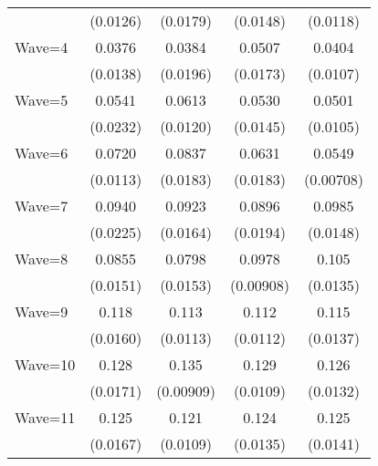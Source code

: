 {\begin{tabular}{l*{4}{c}}
                    &    (0.0126)         &    (0.0179)         &    (0.0148)         &    (0.0118)         \\
[1em]
Wave=4              &      0.0376\sym{**} &      0.0384         &      0.0507\sym{**} &      0.0404\sym{***}\\
                    &    (0.0138)         &    (0.0196)         &    (0.0173)         &    (0.0107)         \\
[1em]
Wave=5              &      0.0541\sym{*}  &      0.0613\sym{***}&      0.0530\sym{***}&      0.0501\sym{***}\\
                    &    (0.0232)         &    (0.0120)         &    (0.0145)         &    (0.0105)         \\
[1em]
Wave=6              &      0.0720\sym{***}&      0.0837\sym{***}&      0.0631\sym{***}&      0.0549\sym{***}\\
                    &    (0.0113)         &    (0.0183)         &    (0.0183)         &   (0.00708)         \\
[1em]
Wave=7              &      0.0940\sym{***}&      0.0923\sym{***}&      0.0896\sym{***}&      0.0985\sym{***}\\
                    &    (0.0225)         &    (0.0164)         &    (0.0194)         &    (0.0148)         \\
[1em]
Wave=8              &      0.0855\sym{***}&      0.0798\sym{***}&      0.0978\sym{***}&       0.105\sym{***}\\
                    &    (0.0151)         &    (0.0153)         &   (0.00908)         &    (0.0135)         \\
[1em]
Wave=9              &       0.118\sym{***}&       0.113\sym{***}&       0.112\sym{***}&       0.115\sym{***}\\
                    &    (0.0160)         &    (0.0113)         &    (0.0112)         &    (0.0137)         \\
[1em]
Wave=10             &       0.128\sym{***}&       0.135\sym{***}&       0.129\sym{***}&       0.126\sym{***}\\
                    &    (0.0171)         &   (0.00909)         &    (0.0109)         &    (0.0132)         \\
[1em]
Wave=11             &       0.125\sym{***}&       0.121\sym{***}&       0.124\sym{***}&       0.125\sym{***}\\
                    &    (0.0167)         &    (0.0109)         &    (0.0135)         &    (0.0141)         \\

\end{tabular}}
